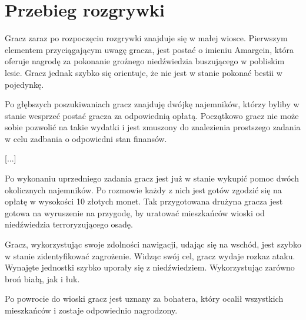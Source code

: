 \section{Przebieg rozgrywki}
Gracz zaraz po rozpoczęciu rozgrywki znajduje się w małej wiosce. Pierwszym
elementem przyciągającym uwagę gracza, jest postać o imieniu Amargein, która oferuje
nagrodę za pokonanie groźnego niedźwiedzia buszującego w pobliskim lesie. Gracz jednak
szybko się orientuje, że nie jest w stanie pokonać bestii w pojedynkę.

Po głębszych poszukiwaniach gracz znajduję dwójkę najemników, którzy byliby w stanie
wesprzeć postać gracza za odpowiednią opłatą. Początkowo gracz nie może sobie
pozwolić na takie wydatki i jest zmuszony do znalezienia prostszego zadania
w celu zadbania o odpowiedni stan finansów.

[...]

Po wykonaniu uprzedniego zadania gracz jest już w stanie wykupić pomoc dwóch okolicznych
najemników. Po rozmowie każdy z nich jest gotów zgodzić się na opłatę w wysokości 10 złotych monet.
Tak przygotowana drużyna gracza jest gotowa na wyruszenie na przygodę, by uratować
mieszkańców wioski od niedźwiedzia terroryzującego osadę.

Gracz, wykorzystując swoje zdolności nawigacji, udając się na wschód, jest szybko w stanie zidentyfikować zagrożenie.
Widząc swój cel, gracz wydaje rozkaz ataku. Wynajęte jednostki szybko uporały się z niedźwiedziem. Wykorzystując zarówno
broń białą, jak i łuk.

Po powrocie do wioski gracz jest uznany za bohatera, który ocalił wszystkich mieszkańców i zostaje odpowiednio nagrodzony.

